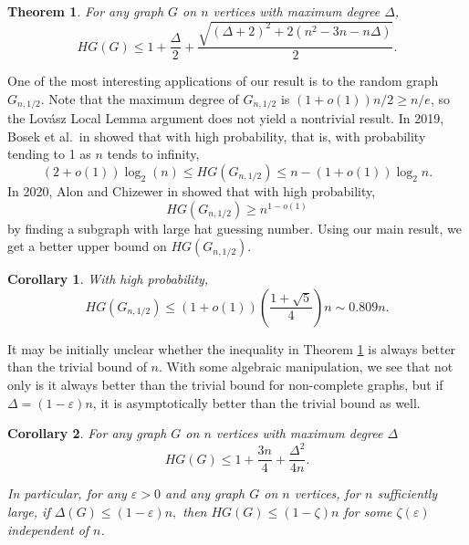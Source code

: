 \documentclass{amsart}
\newcommand{\1}{\mathds{1}}
\newtheorem{theorem}{Theorem}
\newtheorem{cor}{Corollary}
\numberwithin{theorem}{section}
\newcommand{\darkBlue}[1]{{\color{DarkBlue}{#1}}}
\newcommand{\mason}[1]{\darkBlue{\bf [Mason: #1]}}
\begin{document}
\begin{theorem}\label{thm:main} For any graph $G$ on $n$ vertices with maximum degree $\Delta$,
       $$ HG(G) \leq 1+\frac{\Delta}{2}+ \frac{\sqrt{(\Delta +2)^2 + 2(n^2-3n-n\Delta)}}{2}.$$
\end{theorem}


One of the most interesting applications of our result is to the random graph $G_{n,1/2}$. %
Note that the maximum degree of $G_{n,1/2}$ is $(1+o(1))n/2\geq n/e$, so the Lovász Local Lemma argument does not yield a nontrivial result. In 2019, Bosek et al.\ in \cite{bosek2021hat} showed that with high probability, that is, with probability tending to 1 as $n$ tends to infinity, $$(2+o(1))\log_2(n)\leq HG(G_{n,1/2})\leq n-(1+o(1))\log_2 n.$$ In 2020, Alon and Chizewer in \cite{alon2022hat} showed that with high probability, $$ HG(G_{n,1/2}) \geq n^{1-o(1)} $$ by finding a subgraph with large hat guessing number. Using our main result, we get a better upper bound on $HG(G_{n,1/2})$. %

\begin{cor}\label{cor:Gn1,2} With high probability,
$$HG(G_{n,1/2})\leq (1+o(1)) \left(\frac{1+\sqrt5}{4}\right)n \sim 0.809n. $$
\end{cor} 
It may be initially unclear whether the inequality in Theorem \ref{thm:main} is always better than the trivial bound of $n$. With some algebraic manipulation, we see that not only is it always better than the trivial bound for non-complete graphs, but if $\Delta=(1-\varepsilon) n$, it is asymptotically better than the trivial bound as well.
\begin{cor}\label{cor:e-d}
For any graph $G$ on $n$ vertices with maximum degree $\Delta$
$$HG(G) \leq 1+\frac{3n}{4}+\frac{\Delta^2}{4n}.$$

In particular, for any $\varepsilon>0$ and any graph $G$ on $n$ vertices, for $n$ sufficiently large,  if $\Delta(G)\leq (1-\varepsilon )n,$ then $HG(G)\leq (1-\zeta)n$ for some $\zeta(\varepsilon)$ independent of $n$. 

\end{cor}
\end{document}
